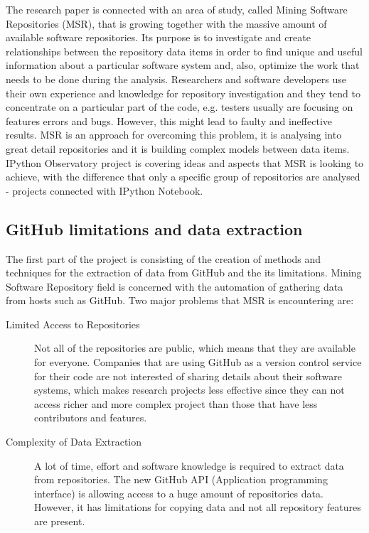 The research paper is connected with an area of study, called Mining Software Repositories (MSR)\cite{MSR2016}, that is growing together with the massive amount of available software repositories. Its purpose is to investigate and create relationships between the repository data items in order to find unique and useful information about a particular software system and, also, optimize the work that needs to be done during the analysis. Researchers and software developers use their own experience and knowledge for repository investigation and they tend to concentrate on a particular part of the code, e.g. testers usually are focusing on features errors and bugs. However, this might lead to faulty and ineffective results. MSR is an approach for overcoming this problem, it is analysing into great detail repositories and it is building complex models between data items\cite{hassan2008road}. IPython Observatory project is covering ideas and aspects that MSR is looking to achieve, with the difference that only a specific group of repositories are analysed - projects connected with IPython Notebook.

\subsection{GitHub limitations and data extraction}
\label{subsec:limitations}
The first part of the project is consisting of the creation of methods and techniques for the extraction of data from GitHub\cite{gitHubWiki} and the its limitations. Mining Software Repository field is concerned with the automation of gathering data from hosts such as GitHub. Two major problems that MSR is encountering are\cite{hassan2008road}:

\vspace{1em}
\begin{description}
    \item[Limited Access to Repositories]  Not all of the repositories are public, which means that they are available for everyone. Companies that are using GitHub as a version control service for their code are not interested of sharing details about their software systems, which makes research projects less effective since they can not access richer and more complex project than those that have less contributors and features\cite{hassan2008road}. 
    
    \item[Complexity of Data Extraction] A lot of time, effort and software knowledge is required to extract data from repositories. The new GitHub API (Application programming interface)\cite{GitAPI} is allowing access to a huge amount of repositories data. However, it has limitations for copying data and not all repository features are present. 
\end{description}
\vspace{1em}

